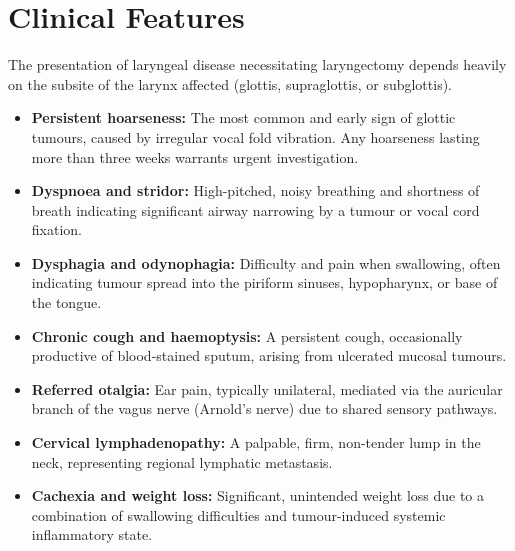 \section*{Clinical Features}
The presentation of laryngeal disease necessitating laryngectomy depends heavily on the subsite of the larynx affected (glottis, supraglottis, or subglottis).
\begin{itemize}
    \item \textbf{Persistent hoarseness:} The most common and early sign of glottic tumours, caused by irregular vocal fold vibration. Any hoarseness lasting more than three weeks warrants urgent investigation.
    \item \textbf{Dyspnoea and stridor:} High-pitched, noisy breathing and shortness of breath indicating significant airway narrowing by a tumour or vocal cord fixation.
    \item \textbf{Dysphagia and odynophagia:} Difficulty and pain when swallowing, often indicating tumour spread into the piriform sinuses, hypopharynx, or base of the tongue.
    \item \textbf{Chronic cough and haemoptysis:} A persistent cough, occasionally productive of blood-stained sputum, arising from ulcerated mucosal tumours.
    \item \textbf{Referred otalgia:} Ear pain, typically unilateral, mediated via the auricular branch of the vagus nerve (Arnold's nerve) due to shared sensory pathways.
    \item \textbf{Cervical lymphadenopathy:} A palpable, firm, non-tender lump in the neck, representing regional lymphatic metastasis.
    \item \textbf{Cachexia and weight loss:} Significant, unintended weight loss due to a combination of swallowing difficulties and tumour-induced systemic inflammatory state.
\end{itemize}

